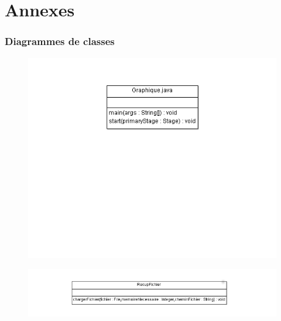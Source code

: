 \part{Annexes} %
\label{prt:annexes}
	

	\section{Diagrammes de classes} %
					
			\label{chap:diag_class}
			\begin{figure}
			\centering
		    \includegraphics []{../diagramme_classes/charts.png} \\
			\label{fig_graph}
			\end{figure}
			\begin{figure}
		    \includegraphics []{../diagramme_classes/donnees.png} \\
			\label{fig_donnees}
  			\end{figure}
